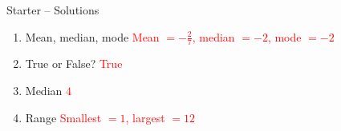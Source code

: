 \documentclass{beamer}
\begin{document}
\begin{frame}{Starter -- Solutions}
\vspace{-0.8em}

\footnotesize
\begin{enumerate}\itemsep2pt
  \item Mean, median, mode  
        \textcolor{red}{Mean $=-\frac{2}{7}$, median $=-2$, mode $=-2$}
  \item True or False?  
        \textcolor{red}{True}
  \item Median  
        \textcolor{red}{$4$}
  \item Range  
        \textcolor{red}{Smallest $=1$, largest $=12$}
\end{enumerate}
\end{frame}
\end{document}
